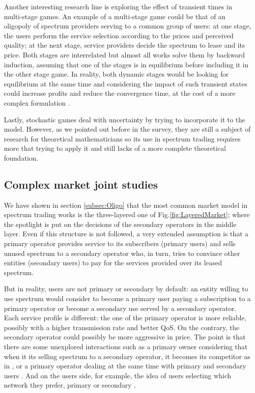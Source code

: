 Another interesting research line is exploring the effect of transient times in multi-stage games. 
An example of a multi-stage game could be that of an oligopoly of spectrum providers serving to a common group of users: at one stage, the users perform the service selection according to the prices and perceived quality; at the next stage, service providers decide the spectrum to lease and its price. 
Both stages are interrelated but almost all works solve them by backward induction, assuming that one of the stages is in equilibrium before including it in the other stage game. 
In reality, both dynamic stages would be looking for equilibrium at the same time and considering the impact of such transient states could increase profits and reduce the convergence time, at the cost of a more complex formulation \cite{ref:Zhu2012_Dyn}.

Lastly, stochastic games deal with uncertainty by trying to incorporate it to the model. 
However, as we pointed out before in the survey, they are still a subject of research for theoretical mathematicians so its use in spectrum trading requires more that trying to apply it and still lacks of a more complete theoretical foundation. 

\subsection{Complex market joint studies}
We have shown in section \ref{subsec:Oligo} that the most common market model in spectrum trading works is the three-layered one of Fig.\ref{fig:LayeredMarket}; where the spotlight is put on the decisions of the secondary operators in the middle layer. 
Even if this structure is not followed, a very extended assumption is that a primary operator provides service to its subscribers (primary users) and sells unused spectrum to a secondary operator who, in turn, tries to convince other entities (secondary users) to pay for the services provided over its leased spectrum. 

But in reality, users are not primary or secondary by default: an entity willing to use spectrum would consider to become a primary user paying a subscription to a primary operator or become a secondary use served by a secondary operator. 
Each service profile is different: the one of the primary operator is more reliable, possibly with a higher transmission rate and better QoS. 
On the contrary, the secondary operator could possibly be more aggressive in price. 
The point is that there are some unexplored interactions such as a primary owner considering that when it its selling spectrum to a secondary operator, it becomes its competitor as in \cite{ref:Guijarro2011}, or a primary operator dealing at the same time with primary and secondary users \cite{ref:Dixit2010}. 
And on the users side, for example, the idea of users selecting which network they prefer, primary or secondary \cite{ref:Elias2013}.

